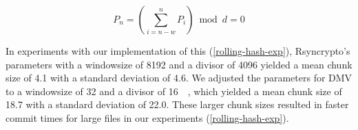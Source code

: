 \begin{equation}
    P_n = \left( \sum_{i = n - w }^{n}{P_i} \right) \bmod d = 0
\end{equation}

In experiments with our implementation of this 
(\autoref{rolling-hash-exp}), Rsyncrypto's parameters with a \gls{windowsize} of
\SI{8192}{\byte} and a divisor of \num{4096} yielded a mean chunk size of
\SI{4.1}{\kib} with a standard deviation of \SI{4.6}{\kib}. We adjusted the
parameters for DMV to a \gls{windowsize} of \SI{32}{\kib} and a divisor of
\SI{16}{\kibi\relax}, which yielded a mean chunk size of \SI{18.7}{\kib} with a
standard deviation of \SI{22.0}{\kib}. These larger chunk sizes resulted in
faster commit times for large files in our experiments
(\autoref{rolling-hash-exp}).

